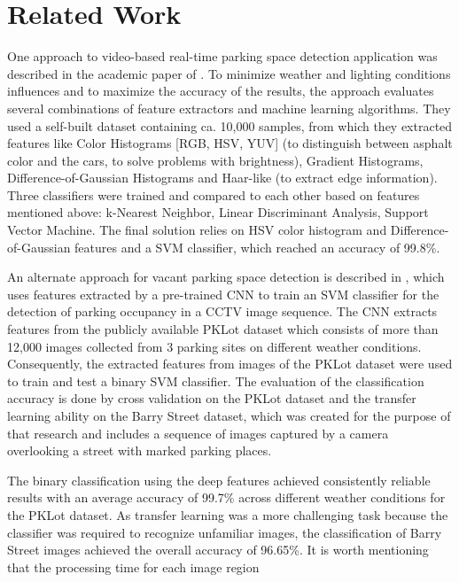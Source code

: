 \documentclass[12pt]{article}
\begin{document}
\section{Related Work}

One approach to video-based real-time parking space detection application 
was described in the academic paper of \cite{tschentscher}. To minimize 
weather and lighting conditions influences and to maximize the accuracy of the 
results, the approach evaluates several combinations of feature extractors and 
machine learning algorithms. They used a self-built dataset containing 
ca. 10,000 samples, from which they extracted features like 
Color Histograms [RGB, HSV, YUV] (to distinguish between asphalt color and the 
cars, to solve problems with brightness), Gradient Histograms, 
Difference-of-Gaussian Histograms and Haar-like (to extract edge information). 
Three classifiers were trained and compared to each other based on features 
mentioned above: k-Nearest Neighbor, Linear Discriminant Analysis, Support 
Vector Machine. The final solution relies on HSV color histogram and 
Difference-of-Gaussian features and a SVM classifier, which reached an 
accuracy of 99.8\%.
\par
An alternate approach for vacant parking space detection is described in 
\cite{debaditya}, which uses features extracted by a pre-trained CNN to 
train an SVM classifier for the detection of parking occupancy in a 
CCTV image sequence.
The CNN extracts features from the publicly available PKLot dataset which 
consists of more than 12,000 images collected from 3 parking sites on 
different weather conditions. 
Consequently, the extracted features from images of the PKLot dataset 
were used to train and test a binary SVM classifier.
The evaluation of the classification accuracy is done by cross validation 
on the PKLot dataset and the transfer learning ability on the Barry 
Street dataset, which was created for the purpose of that research and 
includes a sequence of images captured by a camera overlooking a street 
with marked parking places.
\par
The binary classification using the deep features achieved consistently 
reliable results with an average accuracy of 99.7\% across different weather 
conditions for the PKLot dataset.
As transfer learning was a more challenging task because the classifier 
was required to recognize unfamiliar images, the classification of Barry 
Street images achieved the overall accuracy of 96.65\%.
It is worth mentioning that the processing time for each image region 
\end{document}
